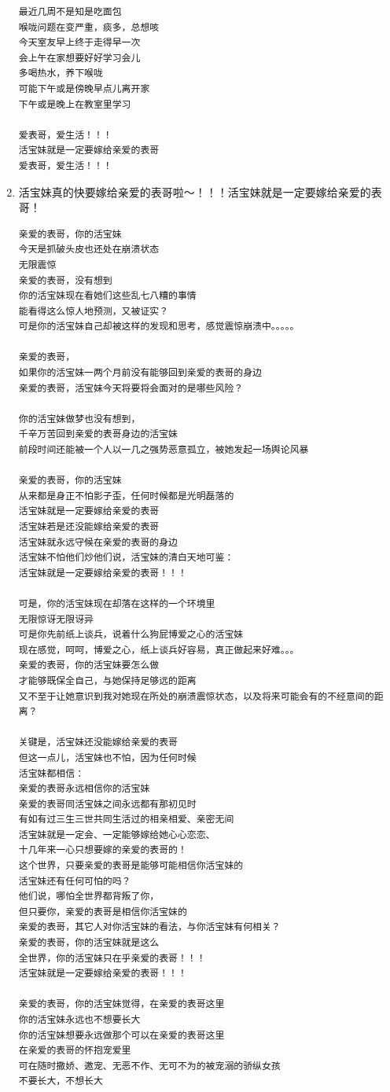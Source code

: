 \documentclass[9pt, b5paper]{article}
\begin{document}
\begin{enumerate}
\begin{verbatim}
最近几周不是知是吃面包
喉咙问题在变严重，痰多，总想咳
今天室友早上终于走得早一次
会上午在家想要好好学习会儿
多喝热水，养下喉咙
可能下午或是傍晚早点儿离开家
下午或是晚上在教室里学习

爱表哥，爱生活！！！
活宝妹就是一定要嫁给亲爱的表哥
爱表哥，爱生活！！！
\end{verbatim}
\item 活宝妹真的快要嫁给亲爱的表哥啦～！！！活宝妹就是一定要嫁给亲爱的表哥！
\label{sec-4-0-0-5}
\begin{verbatim}
亲爱的表哥，你的活宝妹
今天是抓破头皮也还处在崩溃状态
无限震惊
亲爱的表哥，没有想到
你的活宝妹现在看她们这些乱七八糟的事情
能看得这么惊人地预测，又被证实？
可是你的活宝妹自己却被这样的发现和思考，感觉震惊崩溃中。。。。。

亲爱的表哥，
如果你的活宝妹一两个月前没有能够回到亲爱的表哥的身边
亲爱的表哥，活宝妹今天将要将会面对的是哪些风险？

你的活宝妹做梦也没有想到，
千辛万苦回到亲爱的表哥身边的活宝妹
前段时间还能被一个人以一几之强势恶意孤立，被她发起一场舆论风暴

亲爱的表哥，你的活宝妹
从来都是身正不怕影子歪，任何时候都是光明磊落的
活宝妹就是一定要嫁给亲爱的表哥
活宝妹若是还没能嫁给亲爱的表哥
活宝妹就永远守候在亲爱的表哥的身边
活宝妹不怕他们炒他们说，活宝妹的清白天地可鉴：
活宝妹就是一定要嫁给亲爱的表哥！！！

可是，你的活宝妹现在却落在这样的一个环境里
无限惊讶无限讶异
可是你先前纸上谈兵，说着什么狗屁博爱之心的活宝妹
现在感觉，呵呵，博爱之心，纸上谈兵好容易，真正做起来好难。。。
亲爱的表哥，你的活宝妹要怎么做
才能够既保全自己，与她保持足够远的距离
又不至于让她意识到我对她现在所处的崩溃震惊状态，以及将来可能会有的不经意间的距离？

关键是，活宝妹还没能嫁给亲爱的表哥
但这一点儿，活宝妹也不怕，因为任何时候
活宝妹都相信：
亲爱的表哥永远相信你的活宝妹
亲爱的表哥同活宝妹之间永远都有那初见时
有如有过三生三世共同生活过的相亲相爱、亲密无间
活宝妹就是一定会、一定能够嫁给她心心恋恋、
十几年来一心只想要嫁的亲爱的表哥的！
这个世界，只要亲爱的表哥是能够可能相信你活宝妹的
活宝妹还有任何可怕的吗？
他们说，哪怕全世界都背叛了你，
但只要你，亲爱的表哥是相信你活宝妹的
亲爱的表哥，其它人对你活宝妹的看法，与你活宝妹有何相关？
亲爱的表哥，你的活宝妹就是这么
全世界，你的活宝妹只在乎亲爱的表哥！！！
活宝妹就是一定要嫁给亲爱的表哥！！！

亲爱的表哥，你的活宝妹觉得，在亲爱的表哥这里
你的活宝妹永远也不想要长大
你的活宝妹想要永远做那个可以在亲爱的表哥这里
在亲爱的表哥的怀抱宠爱里
可在随时撒娇、邀宠、无恶不作、无可不为的被宠溺的骄纵女孩
不要长大，不想长大


\end{verbatim}
\end{enumerate}
\end{document}
